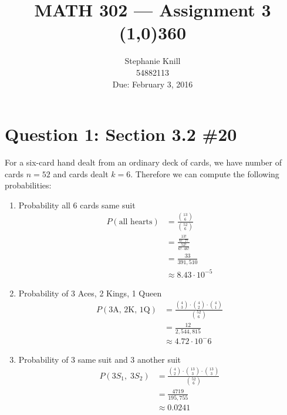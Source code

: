 \documentclass[11pt, oneside]{article}   	%
\begin{document}
\title{MATH 302 --- Assignment 3 \\
\line(1,0){360} \\              %
}
\author{
Stephanie Knill \\
54882113 \\
Due: February 3, 2016}

\date{}                   %
\maketitle




\section*{Question 1: Section 3.2 \#20}

For a six-card hand dealt from an ordinary deck of cards, we have number of cards $n=52$ and cards dealt $k=6$. Therefore we can compute the following probabilities:
\begin{enumerate}[\quad (a)]
	\item Probability all 6 cards same suit
	\begin{align*}
		P(\text{all hearts}) & = \frac{{13 \choose 6}}{{52 \choose 6}} \\
		& = \frac{\frac{13!}{6!\cdot7!}}{\frac{52!}{6! \cdot 46!}} \\
		& = \frac{33}{391,510} \\
		& \approx 8.43 \cdot 10^{-5}
	\end{align*}
	
	\item Probability of 3 Aces, 2 Kings, 1 Queen
	\begin{align*}
		P(\text{3A, 2K, 1Q}) & = \frac{{4 \choose 3}\cdot {4 \choose 2} \cdot {4 \choose 1}}{{52 \choose 6}} \\
		& = \frac{12}{2,544,815} \\
		& \approx 4.72 \cdot 10^-6
	\end{align*}
	
	\item Probability of 3 same suit and 3 another suit
	\begin{align*}
		P(3S_1, \; 3S_2) & = \frac{{4 \choose 2}\cdot {13 \choose 3} \cdot {13 \choose 3}}    {{52 \choose 6}} \\
		& = \frac{4719}{195,755} \\
		& \approx 0.0241
	\end{align*}
\end{enumerate}
\end{document}
